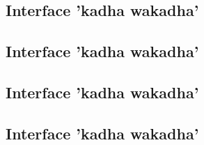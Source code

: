     \subsection{Interface 'kadha wakadha'}
    \subsection{Interface 'kadha wakadha'}
    \subsection{Interface 'kadha wakadha'}
    \subsection{Interface 'kadha wakadha'}

\newpage

\leftskip=0cm
\renewcommand{\bibname}{Référence bibliographique et webographique du chapitre 4}
	
